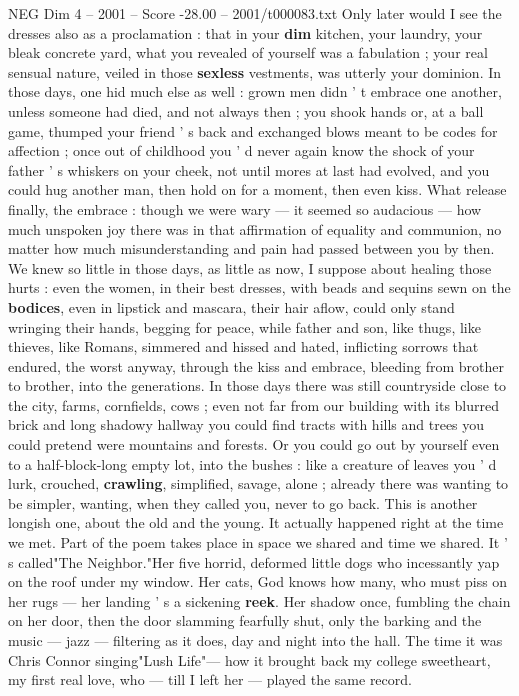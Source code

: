 \begin{textsample}{NEG Dim 4 – 2001 – Score -28.00 – 2001/t000083.txt}
Only later would I see the dresses also as a proclamation : that in your \textbf{dim} kitchen, your laundry, your bleak concrete yard, what you revealed of yourself was a fabulation ; your real sensual nature, veiled in those \textbf{sexless} vestments, was utterly your dominion.
In those days, one hid much else as well : grown men didn ' t embrace one another, unless someone had died, and not always then ; you shook hands or, at a ball game, thumped your friend ' s back and exchanged blows meant to be codes for affection ; once out of childhood you ' d never again know the shock of your father ' s whiskers on your cheek, not until mores at last had evolved, and you could hug another man, then hold on for a moment, then even kiss.
What release finally, the embrace : though we were wary — it seemed so audacious — how much unspoken joy there was in that affirmation of equality and communion, no matter how much misunderstanding and pain had passed between you by then.
We knew so little in those days, as little as now, I suppose about healing those hurts : even the women, in their best dresses, with beads and sequins sewn on the \textbf{bodices}, even in lipstick and mascara, their hair aflow, could only stand wringing their hands, begging for peace, while father and son, like thugs, like thieves, like Romans, simmered and hissed and hated, inflicting sorrows that endured, the worst anyway, through the kiss and embrace, bleeding from brother to brother, into the generations.
In those days there was still countryside close to the city, farms, cornfields, cows ; even not far from our building with its blurred brick and long shadowy hallway you could find tracts with hills and trees you could pretend were mountains and forests.
Or you could go out by yourself even to a half-block-long empty lot, into the bushes : like a creature of leaves you ' d lurk, crouched, \textbf{crawling}, simplified, savage, alone ; already there was wanting to be simpler, wanting, when they called you, never to go back.
This is another longish one, about the old and the young.
It actually happened right at the time we met.
Part of the poem takes place in space we shared and time we shared.
It ' s called"The Neighbor."Her five horrid, deformed little dogs who incessantly yap on the roof under my window.
Her cats, God knows how many, who must piss on her rugs — her landing ' s a sickening \textbf{reek}.
Her shadow once, fumbling the chain on her door, then the door slamming fearfully shut, only the barking and the music — jazz — filtering as it does, day and night into the hall.
The time it was Chris Connor singing"Lush Life"— how it brought back my college sweetheart, my first real love, who — till I left her — played the same record.

\end{textsample}
